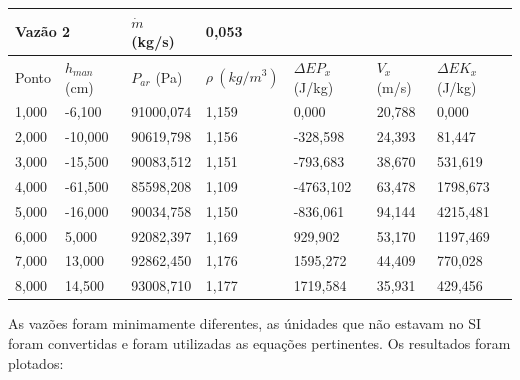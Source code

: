 \documentclass[12pt, a4]{article}
\begin{document}
\begin{table}[H]
    \begin{tabular}{|ll|l|l|lll}
    \cline{1-4}
    \multicolumn{2}{|l|}{Vazão 2}         & $ \dot{m} $ (kg/s) & 0,053 &                                &                             &                               \\ \hline
    \multicolumn{1}{|l|}{Ponto} &
      $h_{man}$ (cm) &
      $P_{ar}$ (Pa) &
      $\rho \ (kg / m^3)$ &
      \multicolumn{1}{l|}{$ \Delta EP_x $ (J/kg)} &
      \multicolumn{1}{l|}{$V_x$ (m/s)} &
      \multicolumn{1}{l|}{$ \Delta EK_x $ (J/kg)} \\ \hline
    \multicolumn{1}{|l|}{1,000} & -6,100  & 91000,074          & 1,159 & \multicolumn{1}{l|}{0,000}     & \multicolumn{1}{l|}{20,788} & \multicolumn{1}{l|}{0,000}    \\ \hline
    \multicolumn{1}{|l|}{2,000} & -10,000 & 90619,798          & 1,156 & \multicolumn{1}{l|}{-328,598}  & \multicolumn{1}{l|}{24,393} & \multicolumn{1}{l|}{81,447}   \\ \hline
    \multicolumn{1}{|l|}{3,000} & -15,500 & 90083,512          & 1,151 & \multicolumn{1}{l|}{-793,683}  & \multicolumn{1}{l|}{38,670} & \multicolumn{1}{l|}{531,619}  \\ \hline
    \multicolumn{1}{|l|}{4,000} & -61,500 & 85598,208          & 1,109 & \multicolumn{1}{l|}{-4763,102} & \multicolumn{1}{l|}{63,478} & \multicolumn{1}{l|}{1798,673} \\ \hline
    \multicolumn{1}{|l|}{5,000} & -16,000 & 90034,758          & 1,150 & \multicolumn{1}{l|}{-836,061}  & \multicolumn{1}{l|}{94,144} & \multicolumn{1}{l|}{4215,481} \\ \hline
    \multicolumn{1}{|l|}{6,000} & 5,000   & 92082,397          & 1,169 & \multicolumn{1}{l|}{929,902}   & \multicolumn{1}{l|}{53,170} & \multicolumn{1}{l|}{1197,469} \\ \hline
    \multicolumn{1}{|l|}{7,000} & 13,000  & 92862,450          & 1,176 & \multicolumn{1}{l|}{1595,272}  & \multicolumn{1}{l|}{44,409} & \multicolumn{1}{l|}{770,028}  \\ \hline
    \multicolumn{1}{|l|}{8,000} & 14,500  & 93008,710          & 1,177 & \multicolumn{1}{l|}{1719,584}  & \multicolumn{1}{l|}{35,931} & \multicolumn{1}{l|}{429,456}  \\ \hline
    \end{tabular}
\end{table}

As vazões foram minimamente diferentes, as únidades que não estavam no SI foram convertidas e foram utilizadas as equações pertinentes.
Os resultados foram plotados:
\end{document}
